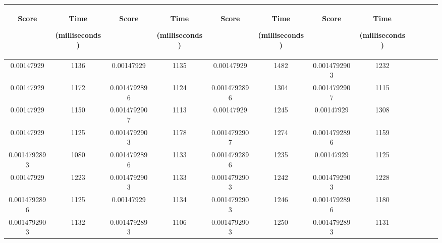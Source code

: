   \begin {table}[h]

       
  \begin{tabular}{|c|c|c|c|c|c|c|c|c|c|c|c|} 
  \midrule
 \begin{sideways}Score\end{sideways}& \begin{sideways}Time\end{sideways} \begin{sideways} (milliseconds)\end{sideways}& \begin{sideways}Score\end{sideways}& \begin{sideways}Time\end{sideways}  \begin{sideways}(milliseconds)\end{sideways}& \begin{sideways}Score\end{sideways}& \begin{sideways}Time\end{sideways}  \begin{sideways}(milliseconds)\end{sideways}& \begin{sideways}Score\end{sideways}& \begin{sideways}Time\end{sideways}  \begin{sideways} (milliseconds)\end{sideways}\\
\midrule
0.00147929&1136&0.00147929&1135&0.00147929&1482&0.0014792903&1232\\
\midrule
0.00147929&1172&0.0014792896&1124&0.0014792896&1304&0.0014792907&1115\\
\midrule
0.00147929&1150&0.0014792907&1113&0.00147929&1245&0.00147929&1308\\
\midrule
0.00147929&1125&0.0014792903&1178&0.0014792907&1274&0.0014792896&1159\\
\midrule
0.0014792893&1080&0.0014792896&1133&0.0014792896&1235&0.00147929&1125\\
\midrule
0.00147929&1223&0.0014792903&1133&0.0014792903&1242&0.0014792903&1228\\
\midrule
0.0014792896&1125&0.00147929&1134&0.0014792903&1246&0.0014792896&1180\\
\midrule
0.0014792903&1132&0.0014792893&1106&0.0014792903&1250&0.0014792893&1131\\

\end{tabular}
\end{table}
